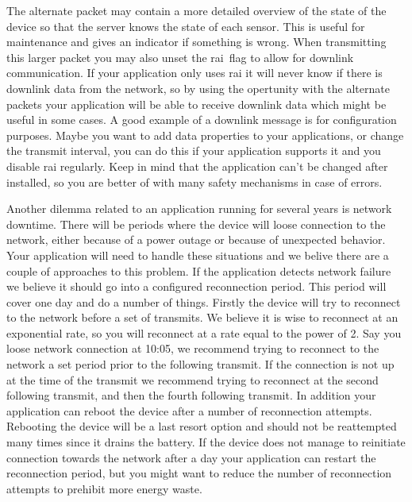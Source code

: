 \documentclass[USenglish]{ifimaster}  %
\begin{document}
The alternate packet may contain a more detailed overview of the state of the device so that the server knows the state of each sensor. This is useful for maintenance and gives an indicator if something is wrong. When transmitting this larger packet you may also unset the \acrshort{rai} flag to allow for downlink communication. If your application only uses \acrshort{rai} it will never know if there is downlink data from the network, so by using the opertunity with the alternate packets your application will be able to receive downlink data which might be useful in some cases. A good example of a downlink message is for configuration purposes. Maybe you want to add data properties to your applications, or change the transmit interval, you can do this if your application supports it and you disable \acrshort{rai} regularly. Keep in mind that the application can't be changed after installed, so you are better of with many safety mechanisms in case of errors.

Another dilemma related to an application running for several years is network downtime. There will be periods where the device will loose connection to the network, either because of a power outage or because of unexpected behavior. Your application will need to handle these situations and we belive there are a couple of approaches to this problem. If the application detects network failure we believe it should go into a configured reconnection period. This period will cover one day and do a number of things. Firstly the device will try to reconnect to the network before a set of transmits. We believe it is wise to reconnect at an exponential rate, so you will reconnect at a rate equal to the power of 2. Say you loose network connection at 10:05, we recommend trying to reconnect to the network a set period prior to the following transmit. If the connection is not up at the time of the transmit we recommend trying to reconnect at the second following transmit, and then the fourth following transmit. In addition your application can reboot the device after a number of reconnection attempts. Rebooting the device will be a last resort option and should not be reattempted many times since it drains the battery. If the device does not manage to reinitiate connection towards the network after a day your application can restart the reconnection period, but you might want to reduce the number of reconnection attempts to prehibit more energy waste.
\end{document}
